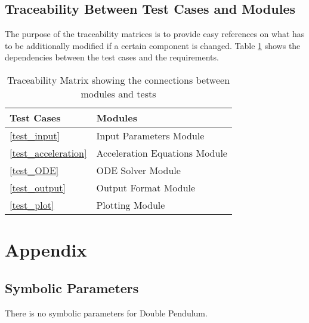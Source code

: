 \documentclass[12pt, titlepage]{article}
\begin{document}
\subsection{Traceability Between Test Cases and Modules}

The purpose of the traceability matrices is to provide easy references on what
has to be additionally modified if a certain component is changed. Table
\ref{Tb_trace} shows the
dependencies between the test cases and the requirements.

\begin{table}[h]
\centering
\begin{tabular}{@{}ll@{}}
\toprule
Test Cases & Modules \\ \midrule
\ref{test_input} & Input Parameters Module \\
\ref{test_acceleration} & Acceleration Equations Module\\
\ref{test_ODE} & ODE Solver Module \\
\ref{test_output} & Output Format Module \\
\ref{test_plot} & Plotting Module\\
\bottomrule
\end{tabular}
\caption{Traceability Matrix showing the connections between modules and
tests}
\label{Tb_trace}
\end{table}






\newpage

\section{Appendix}


\subsection{Symbolic Parameters}
There is no symbolic parameters for Double Pendulum. 
 
\end{document}
